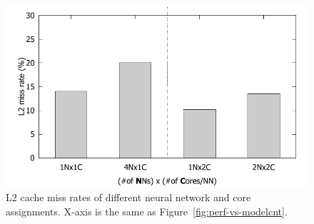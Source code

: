 


\begin{figure}[h]
  \centering
  \includegraphics[width=.45\textwidth]{figs/l2missrate_vs_modelcnt}
  \caption{L2 cache miss rates of different neural network and core
    assignments. X-axis is the same as Figure~\ref{fig:perf-vs-modelcnt}.} 
  \label{fig:l2missrate-vs-modelcnt}
\end{figure}


